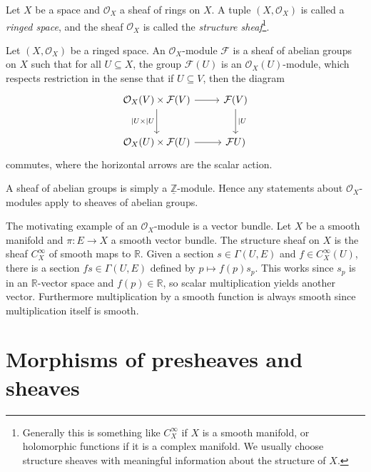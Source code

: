 \begin{definition}\label{dfn:2-2-12}
	Let $X$ be a space and $\mathcal{O} _X$ a sheaf of rings on $X$. A tuple $(X,\mathcal{O}_X)$ is called a \emph{ringed space}, and the sheaf $\mathcal{O} _X$ is called the \emph{structure sheaf}\footnote{Generally this is something like $C^\infty _X$ if $X$ is a smooth manifold, or holomorphic functions if it is a complex manifold. We usually choose structure sheaves with meaningful information about the structure of $X$.}.
\end{definition}
\begin{definition}\label{dfn:2-2-13}
	Let $(X,\mathcal{O} _X)$ be a ringed space. An $\mathcal{O} _X$-module $\mathcal{F} $ is a sheaf of abelian groups on $X$ such that for all $U\subseteq X$, the group $\mathcal{F} (U)$ is an $\mathcal{O} _X(U)$-module, which respects restriction in the sense that if $U\subseteq V$, then the diagram
	\[\begin{tikzcd}[row sep = 2.5em, column sep = 2.5em]
	\mathcal{O} _X(V)\times \mathcal{F} (V)\ar[r]\ar[" |U\times |U "', d]   & \mathcal{F} (V)\ar[" |U ", d]  \\
	\mathcal{O} _X(U)\times \mathcal{F} (U)\ar[r]  & \mathcal{F} U)
	\end{tikzcd}\]
	commutes, where the horizontal arrows are the scalar action.
\end{definition}
\begin{remark}
	A sheaf of abelian groups is simply a $\underline{\mathbb{Z} }$-module. Hence any statements about $\mathcal{O} _X$-modules apply to sheaves of abelian groups.
\end{remark}

The motivating example of an $\mathcal{O} _X$-module is a vector bundle. Let $X$ be a smooth manifold and $\pi : E \to X$ a smooth vector bundle. The structure sheaf on $X$ is the sheaf $C^\infty _X$ of smooth maps to $\mathbb{R} $. Given a section $s\in \Gamma (U,E)$ and $f\in C^\infty _X(U)$, there is a section $fs\in \Gamma (U,E)$ defined by $p\mapsto f(p)s_p$. This works since $s_p$ is in an $\mathbb{R} $-vector space and $f(p)\in\mathbb{R} $, so scalar multiplication yields another vector. Furthermore multiplication by a smooth function is always smooth since multiplication itself is smooth.

\section{Morphisms of presheaves and sheaves}

